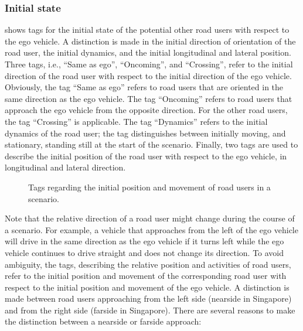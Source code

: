 \subsubsection{Initial state}
 shows tags for the initial state of the potential other road users with respect to the ego vehicle. A distinction is made in the initial direction of orientation of the road user, the initial dynamics, and the initial longitudinal and lateral position. Three tags, i.e., ``Same as ego'', ``Oncoming'', and ``Crossing'', refer to the initial direction of the road user with respect to the initial direction of the ego vehicle. Obviously, the tag ``Same as ego'' refers to road users that are oriented in the same direction as the ego vehicle. The tag ``Oncoming'' refers to road users that approach the ego vehicle from the opposite direction. For the other road users, the tag ``Crossing'' is applicable.
The tag ``Dynamics'' refers to the initial dynamics of the road user; the tag distinguishes between initially moving, and stationary, standing still at the start of the scenario. 
Finally, two tags are used to describe the initial position of the road user with respect to the ego vehicle, in longitudinal and lateral direction. 

\begin{figure}
	\centering
	\caption{Tags regarding the initial position and movement of road users in a scenario.}
	\label{fig:tree initial state}
\end{figure}

Note that the relative direction of a road user might change during the course of a scenario. For example, a vehicle that approaches from the left of the ego vehicle will drive in the same direction as the ego vehicle if it turns left while the ego vehicle continues to drive straight and does not change its direction. To avoid ambiguity, the tags, describing the relative position and activities of road users, refer to the initial position and movement of the corresponding road user with respect to the initial position and movement of the ego vehicle. 
A distinction is made between road users approaching from the left side (nearside in Singapore) and from the right side (farside in Singapore). There are several reasons to make the distinction between a nearside or farside approach:

